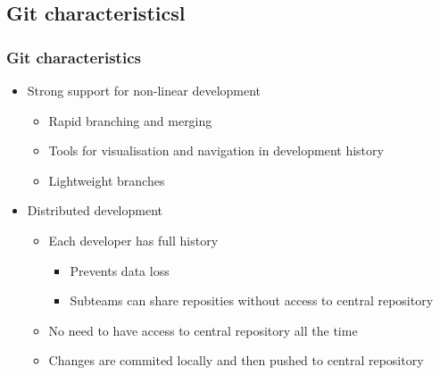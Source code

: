 \subsection[]{Git characteristicsl}
\begin{frame}
\frametitle{Git characteristics}
\begin{itemize}
	\item Strong support for non-linear development
		\begin{itemize}
		\item Rapid branching and merging
		\item Tools for visualisation and navigation in development history
		\item Lightweight branches %
		\end{itemize}
	\item Distributed development
		\begin{itemize}
		\item Each developer has full history
			\begin{itemize}
			\item Prevents data loss
			\item Subteams can share reposities without access to central repository
			\end{itemize}
		\item No need to have access to central repository all the time
		\item Changes are commited locally and then pushed to central repository
		\end{itemize}%
\end{itemize}
\end{frame}

